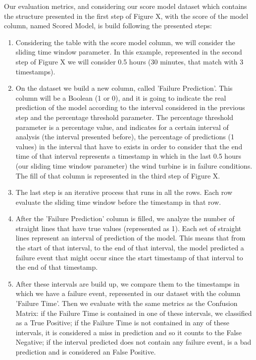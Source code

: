 Our evaluation metrics, and considering our score model dataset which contains the structure presented in the first step of Figure X, with the score of the model column, named Scored Model, is build following the presented steps:
\begin{enumerate}
    \item
Considering the table with the score model column, we will consider the sliding time window parameter. In this example, represented in the second step of Figure X we will consider 0.5 hours (30 minutes, that match with 3 timestamps).
    \item
On the dataset we build a new column, called 'Failure Prediction'. This column will be a Boolean (1 or 0), and it is going to indicate the real prediction of the model according to the interval considered in the previous step and the percentage threshold parameter.
The percentage threshold parameter is a percentage value, and indicates for a certain interval of analysis (the interval presented before), the percentage of predictions (1 values) in the interval that have to exists in order to consider that the end time of that interval represents a timestamp in which in the last 0.5 hours (our sliding time window parameter) the wind turbine is in failure conditions. The fill of that column is represented in the third step of Figure X.
    \item
The last step is an iterative process that runs in all the rows. Each row evaluate the sliding time window before the timestamp in that row.
    \item
After the 'Failure Prediction' column is filled, we analyze the number of straight lines that have true values (represented as 1). Each set of straight lines represent an interval of prediction of the model. This means that from the start of that interval, to the end of that interval, the model predicted a failure event that might occur since the start timestamp of that interval to the end of that timestamp.
    \item
After these intervals are build up, we compare them to the timestamps in which we have a failure event, represented in our dataset with the column 'Failure Time'.
Then we evaluate with the same metrics as the Confusion Matrix: if the Failure Time is contained in one of these intervals, we classified as a True Positive; if the Failure Time is not contained in any of these intervals, it is considered a miss in prediction and so it counts to the False Negative; if the interval predicted does not contain any failure event, is a bad prediction and is considered an False Positive.
\end{enumerate}

